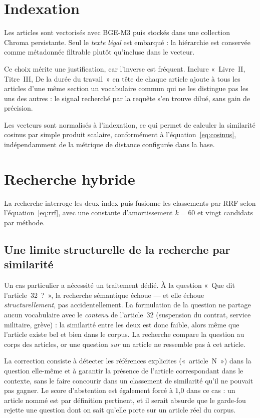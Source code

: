 \section{Indexation}
\label{sec:indexation}

Les \NbArticles{} articles sont vectorisés avec BGE-M3 puis stockés dans une collection Chroma
persistante. Seul le \emph{texte légal} est embarqué : la hiérarchie est conservée comme
métadonnée filtrable plutôt qu'incluse dans le vecteur.

Ce choix mérite une justification, car l'inverse est fréquent. Inclure «~Livre~II, Titre~III, De
la durée du travail~» en tête de chaque article ajoute à tous les articles d'une même section un
vocabulaire commun qui ne les distingue pas les uns des autres : le signal recherché par la
requête s'en trouve dilué, sans gain de précision.

Les vecteurs sont normalisés à l'indexation, ce qui permet de calculer la similarité cosinus par
simple produit scalaire, conformément à l'équation~\eqref{eq:cosinus}, indépendamment de la
métrique de distance configurée dans la base.

\section{Recherche hybride}

La recherche interroge les deux index puis fusionne les classements par RRF selon
l'équation~\eqref{eq:rrf}, avec une constante d'amortissement $k = 60$ et vingt candidats par
méthode.

\subsection{Une limite structurelle de la recherche par similarité}
\label{sec:refexplicite}

Un cas particulier a nécessité un traitement dédié. À la question «~Que dit l'article~32~?~», la
recherche sémantique échoue --- et elle échoue \emph{structurellement}, pas accidentellement. La
formulation de la question ne partage aucun vocabulaire avec le \emph{contenu} de l'article~32
(suspension du contrat, service militaire, grève) : la similarité entre les deux est donc faible,
alors même que l'article existe bel et bien dans le corpus. La recherche compare la question au
corps des articles, or une question \emph{sur} un article ne ressemble pas à cet article.

La correction consiste à détecter les références explicites («~article~N~») dans la question
elle-même et à garantir la présence de l'article correspondant dans le contexte, sans le faire
concourir dans un classement de similarité qu'il ne pouvait pas gagner. Le score d'abstention est
également forcé à 1,0 dans ce cas : un article nommé est par définition pertinent, et il serait
absurde que le garde-fou rejette une question dont on sait qu'elle porte sur un article réel du
corpus.

